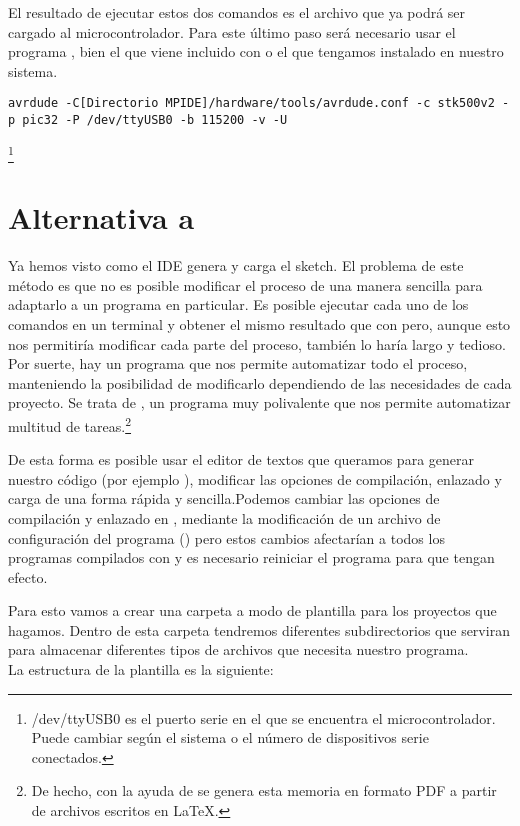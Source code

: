El resultado de ejecutar estos dos comandos es el archivo  que ya podrá ser cargado al microcontrolador.
Para este último paso será necesario usar el programa , bien el que viene incluido con  o el que tengamos instalado en nuestro sistema.
\begin{lstlisting}[breaklines=true]
avrdude -C[Directorio MPIDE]/hardware/tools/avrdude.conf -c stk500v2 -p pic32 -P /dev/ttyUSB0 -b 115200 -v -U
\end{lstlisting}\protect\footnote{/dev/ttyUSB0 es el puerto serie en el que se encuentra el microcontrolador. Puede cambiar según el sistema o el número de dispositivos serie conectados.}

\section{Alternativa a }

Ya hemos visto como el IDE genera y carga el sketch. El problema de este método es que no es posible modificar el proceso de una manera sencilla para adaptarlo a un programa en particular. Es posible ejecutar cada uno de los comandos en un terminal y obtener el mismo resultado que con  pero, aunque esto nos permitiría modificar cada parte del proceso, también lo haría largo y tedioso. Por suerte, hay un programa que nos permite automatizar todo el proceso, manteniendo la posibilidad de modificarlo dependiendo de las necesidades de cada proyecto. Se trata de , un programa muy polivalente que nos permite automatizar multitud de tareas.\footnote{De hecho, con la ayuda de  se genera esta memoria en formato PDF a partir de archivos escritos en \LaTeX.}

De esta forma es posible usar el editor de textos que queramos para generar nuestro código (por ejemplo ), modificar las opciones de compilación, enlazado y carga de una forma rápida y sencilla.Podemos cambiar las opciones de compilación y enlazado en , mediante la  modificación de un archivo de configuración del programa () pero estos cambios afectarían a todos los programas compilados con  y es necesario reiniciar el programa para que tengan efecto. 

Para esto vamos a crear una carpeta a modo de plantilla para los proyectos que hagamos. Dentro de esta carpeta tendremos diferentes subdirectorios que serviran para almacenar diferentes tipos de archivos que necesita nuestro programa.\\
La estructura de la plantilla es la siguiente:

